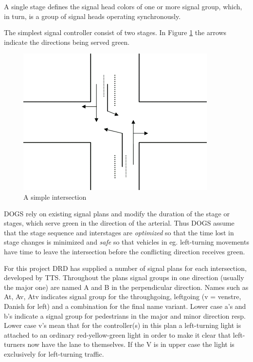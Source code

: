 A single stage defines the signal head colors of one or more signal group, which, in turn, is a group of signal heads operating synchronously.

The simplest signal controller consist of two stages. In  Figure \ref{fig:simple_intersection} the arrows indicate the directions being served green.

\begin{figure}[!ht]
\centering
\includegraphics[scale=0.5]{simple_intersection.png} 
\caption{A simple intersection}
\label{fig:simple_intersection}
\end{figure}

DOGS rely on existing signal plans and modify the duration of the stage or stages, which serve green in the direction of the arterial. Thus DOGS assume that the stage sequence and interstages are \textit{optimized} so that the time lost in stage changes is minimized and \textit{safe} so that vehicles in eg. left-turning movements have time to leave the intersection before the conflicting direction receives green.

For this project DRD has supplied a number of signal plans for each intersection, developed by TTS. Throughout the plans signal groups in one direction (usually the major one) are named A and B in the perpendicular direction. Names such as At, Av, Atv indicates signal group for the throughgoing, leftgoing (v = venstre, Danish for left) and a combination for the final name variant. Lower case a's and b's indicate a signal group for pedestrians in the major and minor direction resp. Lower case v's mean that for the controller(s) in this plan a left-turning light is attached to an ordinary red-yellow-green light in order to make it clear that left-turners now have the lane to themselves. If the V is in upper case the light is exclusively for left-turning traffic.

